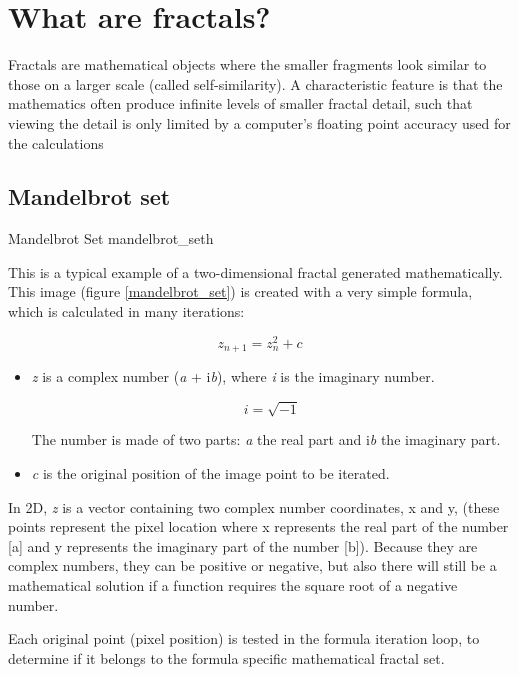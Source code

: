 \section{What are fractals?}\label{what-are-fractals}

Fractals are mathematical objects where the smaller fragments look
similar to those on a larger scale (called self-similarity). A characteristic feature is that the mathematics often produce infinite levels of smaller fractal detail, such that viewing the detail is only limited by a computer's floating point accuracy used for the calculations

\subsection{Mandelbrot set}\label{mandelbrot-set}

{Mandelbrot Set}
{mandelbrot_set}{h}

This is a typical example of a two-dimensional fractal generated mathematically.
This image (figure \ref{mandelbrot_set}) is created with a very simple formula, which is calculated in many
iterations:

\[z_{n + 1} = z_{n}^{2} + c\]

\begin{itemize}
		
\item\emph{z} is a complex number (\emph{a} + i\emph{b}), where \emph{i} is
the imaginary number.
		
\[ i = \sqrt{-1} \]
		
The number is made of two parts: \emph{a} the real part and i\emph{b} the
imaginary part.
		
\item\emph{c} is the original position of the image point to be iterated.
\end{itemize}

In 2D, \emph{z} is a vector containing two complex number coordinates, x and y,
(these points represent the pixel location where x represents the real part of
the number {[}a{]} and y represents the imaginary part of the number {[}b{]}).
Because they are complex numbers, they can be positive or negative, but also
there will still be a mathematical solution if a function requires the square
root of a negative number.

Each original point (pixel position) is tested in the formula iteration loop, to
determine if it belongs to the formula specific mathematical fractal set.

